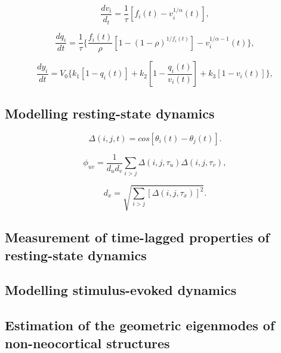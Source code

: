 \documentclass[sn-mathphys-num]{sn-jnl}%
\theoremstyle{thmstyleone}%
\theoremstyle{thmstyletwo}%
\theoremstyle{thmstylethree}%
\begin{document}
\begin{equation}\label{eq:blood_volume}
	\frac{dv_i}{d_t} = \frac{1}{\tau} [f_i(t) - v_i^{1/\alpha} (t)],
\end{equation}


\begin{equation}\label{eq:deoxyhaemoglobin}
	\frac{dq_i}{dt} = \frac{1}{\tau}
	\{
	\frac{f_i(t)}{\rho}
	[1 - (1-\rho)^{1/f_i(t)}]
	- v_i^{1/\alpha - 1} (t)
	\},
\end{equation}


\begin{equation}\label{eq:BOLD_signal}
	\frac{dy_i}{dt} = V_0
	\{
	k_1 [1 - q_i(t)] +
	k_2 [1 - \frac{q_i(t)}{v_i(t)}] + 
	k_3 [1 - v_i(t)]
	\},
\end{equation}


\subsection{Modelling resting-state dynamics} \label{sec:modelling_resting}


\begin{equation}\label{eq:synchrony}
	\Delta(i,j,t) = cos [\theta_i (t) - \theta_j (t)].
\end{equation}


\begin{equation}\label{eq:synchrony_similarity}
	\phi_{uv} = \frac{1}{d_u d_v} 
	\sum_{i>j} \Delta(i,j,\tau_u) \Delta(i,j,\tau_v),
\end{equation}

\begin{equation}\label{key}
	d_x = \sqrt{\sum_{i>j}
		[
		\Delta(i,j,\tau_x)
		]^2
	}.
\end{equation}


\subsection{Measurement of time-lagged properties of resting-state dynamics} \label{sec:dynamics_measurement}






\subsection{Modelling stimulus-evoked dynamics} \label{sec:modelling_stimulus}


\subsection{Estimation of the geometric eigenmodes of non-neocortical structures} \label{sec:geometric_estimation}
\end{document}
